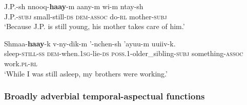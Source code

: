 \begin{exe}

	\ex\label{exAppendixMaricopa1}
	\gll J.P.-sh nnooq-\textbf{haay}-m aany-m wi-m ntay-sh\\
	J.P.-\textsc{subj} small-still-\textsc{ds} \textsc{dem}-\textsc{assoc} do-\textsc{rl} mother-\textsc{subj}\\
	\glt \lq Because J.P. is still young, his mother takes care of him.\rq{ }\parencite[281]{Gordon1986}

	\ex\label{exAppendixMaricopa2}
	\gll Shmaa-\textbf{haay}-k v-ny-dik-m '-nchen-sh 'ayuu-m uuiiv-k.\\
	sleep-\textsc{still}-\textsc{ss} \textsc{dem}-when.1\textsc{sg}-lie-\textsc{ds} \textsc{poss}.1-older\_sibling-\textsc{subj} something-\textsc{assoc} work.\textsc{pl}-\textsc{rl}\\
	\glt \lq While I was still asleep, my brothers were working.' \parencite[269]{Gordon1986}

\end{exe}

\subsubsection{Broadly adverbial temporal-aspectual functions}
